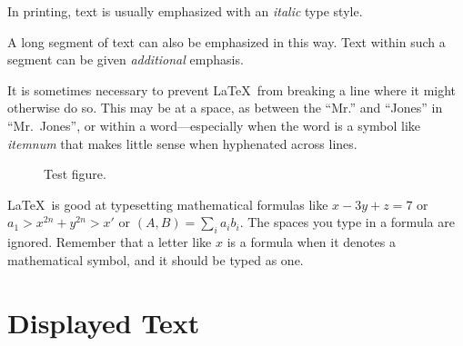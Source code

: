 \documentclass[twocolumn]{article}
\newcommand{\ip}[2]{(#1, #2)}
\begin{document}
In printing, text is usually emphasized with an \emph{italic}  type
style. 

\begin{em}
  A long segment of text can also be emphasized in this way. Text
  within such a segment can be given \emph{additional} emphasis.
\end{em}

It is sometimes necessary to prevent \LaTeX\ from breaking a line
where it might otherwise do so. This may be at a space, as between the
``Mr.'' and ``Jones'' in ``Mr.~Jones'', or within a word---especially
when the word is a symbol like \mbox{\emph{itemnum}} that makes little
sense when hyphenated across lines.
\begin{figure}
\vbox{\centering{}}
\caption{Test figure.}
\end{figure}

\LaTeX\ is good at typesetting mathematical formulas like
 \( x-3y + z = 7 \) 
or
 \( a_{1} > x^{2n} + y^{2n} > x' \)
or 
 \( \ip{A}{B} = \sum_{i} a_{i} b_{i} \).
The spaces you type in a formula are  ignored. Remember that a letter
like $x$  is a formula when it denotes a mathematical symbol, and it
should be typed as one.

\section{Displayed Text}
\end{document}
